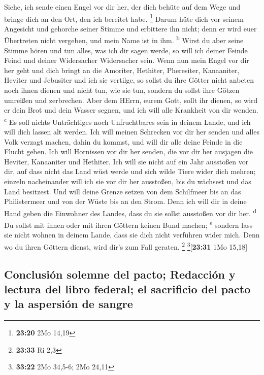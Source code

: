  Siehe, ich sende einen Engel vor dir her, der dich
behüte auf dem Wege und bringe dich an den Ort, den ich bereitet habe.
\footnote{\textbf{23:20} 2Mo 14,19}  Darum hüte dich vor
seinem Angesicht und gehorche seiner Stimme und erbittere ihn nicht;
denn er wird euer Übertreten nicht vergeben, und mein Name ist in ihm.
\textsuperscript{b}  Wirst du aber seine Stimme hören und
tun alles, was ich dir sagen werde, so will ich deiner Feinde Feind und
deiner Widersacher Widersacher sein.  Wenn nun mein Engel
vor dir her geht und dich bringt an die Amoriter, Hethiter, Pheresiter,
Kanaaniter, Heviter und Jebusiter und ich sie vertilge, 
so sollst du ihre Götter nicht anbeten noch ihnen dienen und nicht tun,
wie sie tun, sondern du sollst ihre Götzen umreißen und zerbrechen.
 Aber dem HErrn, eurem Gott, sollt ihr dienen, so wird er
dein Brot und dein Wasser segnen, und ich will alle Krankheit von dir
wenden. \textsuperscript{c}  Es soll nichts Unträchtiges
noch Unfruchtbares sein in deinem Lande, und ich will dich lassen alt
werden.  Ich will meinen Schrecken vor dir her senden und
alles Volk verzagt machen, dahin du kommst, und will dir alle deine
Feinde in die Flucht geben.  Ich will Hornissen vor dir
her senden, die vor dir her ausjagen die Heviter, Kanaaniter und
Hethiter.  Ich will sie nicht auf ein Jahr ausstoßen vor
dir, auf dass nicht das Land wüst werde und sich wilde Tiere wider dich
mehren;  einzeln nacheinander will ich sie vor dir her
ausstoßen, bis du wächsest und das Land besitzest.  Und
will deine Grenze setzen von dem Schilfmeer bis an das Philistermeer und
von der Wüste bis an den Strom. Denn ich will dir in deine Hand geben
die Einwohner des Landes, dass du sie sollst ausstoßen vor dir her.
\textsuperscript{d}  Du sollst mit ihnen oder mit ihren
Göttern keinen Bund machen; \textsuperscript{e}  sondern
lass sie nicht wohnen in deinem Lande, dass sie dich nicht verführen
wider mich. Denn wo du ihren Göttern dienst, wird dir's zum Fall
geraten. \footnote{\textbf{23:33} Ri 2,3} \footnote{\textbf{33:22} 2Mo
  34,5-6; 2Mo 24,11}{[}\textbf{23:31} 1Mo 15,18{]}

\hypertarget{conclusiuxf3n-solemne-del-pacto-redacciuxf3n-y-lectura-del-libro-federal-el-sacrificio-del-pacto-y-la-aspersiuxf3n-de-sangre}{%
\subsection{Conclusión solemne del pacto; Redacción y lectura del libro
federal; el sacrificio del pacto y la aspersión de
sangre}\label{conclusiuxf3n-solemne-del-pacto-redacciuxf3n-y-lectura-del-libro-federal-el-sacrificio-del-pacto-y-la-aspersiuxf3n-de-sangre}}

